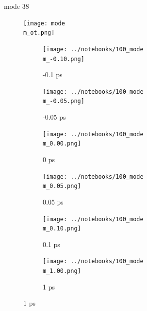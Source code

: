 \documentclass{beamer}
\newcommand\w{0.32}
\begin{document}
\renewcommand\m{38}
\begin{frame}{mode \m}
	\vspace{\vh mm}
	\begin{figure}
		\centering
		\texttt{[image: mode\\m\_ot.png]}
	\end{figure}
	\begin{figure}
		\centering
		\begin{subfigure}[b]{\w\textwidth}
			\centering
			\texttt{[image: ../notebooks/100\_mode\\m\_-0.10.png]}
			\caption{-0.1 ps}
		\end{subfigure}
		\begin{subfigure}[b]{\w\textwidth}
			\centering
			\texttt{[image: ../notebooks/100\_mode\\m\_-0.05.png]}
			\caption{-0.05 ps}
		\end{subfigure}
		\begin{subfigure}[b]{\w\textwidth}
			\centering
			\texttt{[image: ../notebooks/100\_mode\\m\_0.00.png]}
			\caption{0 ps}
		\end{subfigure}
		\begin{subfigure}[b]{\w\textwidth}
			\centering
			\texttt{[image: ../notebooks/100\_mode\\m\_0.05.png]}
			\caption{0.05 ps}
		\end{subfigure}
		\begin{subfigure}[b]{\w\textwidth}
			\centering
			\texttt{[image: ../notebooks/100\_mode\\m\_0.10.png]}
			\caption{0.1 ps}
		\end{subfigure}
		\begin{subfigure}[b]{\w\textwidth}
			\centering
			\texttt{[image: ../notebooks/100\_mode\\m\_1.00.png]}
			\caption{1 ps}
		\end{subfigure}
	\end{figure}
\end{frame}
\end{document}
